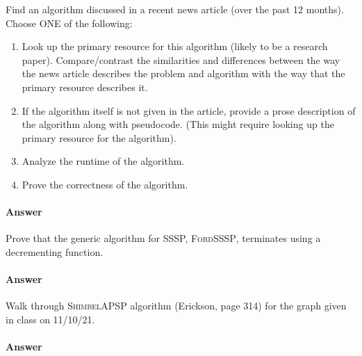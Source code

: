 \documentclass{article}
\begin{document}
Find an algorithm discussed in a recent news article (over the past 12 months).
Choose ONE of the following:
\begin{enumerate}
    \item Look up the primary resource for this algorithm (likely to be a
        research paper).  Compare/contrast the similarities and differences between the
        way the news article describes the problem and algorithm with the way
        that the primary resource describes it.
    \item If the algorithm itself is not given in the article, provide a prose
        description of the algorithm along with pseudocode. (This might require
        looking up the primary resource for the algorithm).
    \item Analyze the runtime of the algorithm.
    \item Prove the correctness of the algorithm.
\end{enumerate}

\paragraph{Answer}

\collab{\todo{}}

Prove that the generic algorithm for SSSP, \textsc{FordSSSP}, terminates using a
decrementing function.

\paragraph{Answer}

\collab{\todo{}}

Walk through \textsc{ShimbelAPSP} algorithm (Erickson, page 314) for the graph given in class on
11/10/21.

\paragraph{Answer}
\end{document}
